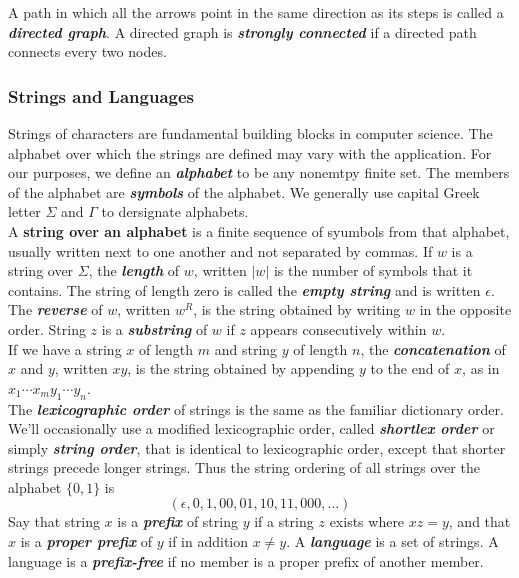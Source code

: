 \documentclass{article}
\newcommand{\define}[1]{\textbf{\textit{#1}}}
\begin{document}
A path in which all the arrows point in the same direction as its steps is called a \define{directed graph}. A directed graph is \define{strongly connected} if a directed path connects every two nodes. 

\subsubsection{Strings and Languages}

Strings of characters are fundamental building blocks in computer science. The alphabet over which the strings are defined may vary with the application. For our purposes, we define an \define{alphabet} to be any nonemtpy finite set. The members of the alphabet are \define{symbols} of the alphabet. We generally use capital Greek letter $\Sigma$ and $\Gamma$ to dersignate alphabets. \\ 

A \textbf{string over an alphabet} is a finite sequence of syumbols from that alphabet, usually written next to one another and not separated by commas. If $w$ is a string over $\Sigma$, the \define{length} of $w$, written $\vert w \vert$ is the number of symbols that it contains. The string of length zero is called the \define{empty string} and is written $\epsilon$. The \define{reverse} of $w$, written $w^{R}$, is the string obtained by writing $w$ in the opposite order. String $z$ is a \define{substring} of $w$ if $z$ appears consecutively within $w$. \\ 

If we have a string $x$ of length $m$ and string $y$ of length $n$, the \define{concatenation} of $x$ and $y$, written $xy$, is the string obtained by appending $y$ to the end of $x$, as in $x_1 \cdots x_{m}y_1 \cdots y_n$. \\ 

The \define{lexicographic order} of strings is the same as the familiar dictionary order. We'll occasionally use a modified lexicographic order, called \define{shortlex order} or simply \define{string order}, that is identical to lexicographic order, except that shorter strings precede longer strings. Thus the string ordering of all strings over the alphabet $\{0,1\}$ is $$(\epsilon,0,1,00,01,10,11,000,\dots)$$ Say that string $x$ is a \define{prefix} of string $y$ if a string $z$ exists where $xz = y$, and that $x$ is a \define{proper prefix} of $y$ if in addition $x \neq y$. A \define{language} is a set of strings. A language is a \define{prefix-free} if no member is a proper prefix of another member. 
\end{document}
